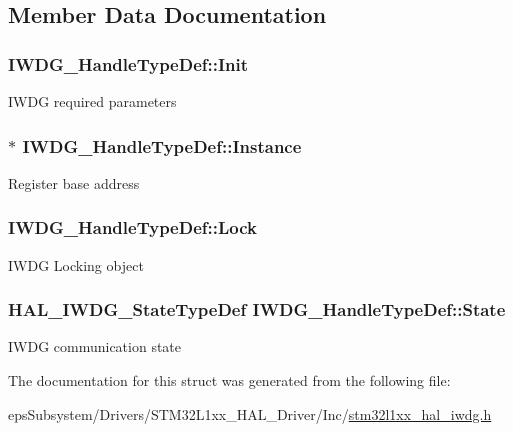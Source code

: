 \subsection{Member Data Documentation}
\hypertarget{struct_i_w_d_g___handle_type_def_ae308075a425af205912feb4059c6f213}{
\subsubsection[{Init}]{ I\-W\-D\-G\-\_\-\-Handle\-Type\-Def\-::\-Init}}\label{struct_i_w_d_g___handle_type_def_ae308075a425af205912feb4059c6f213}
I\-W\-D\-G required parameters \hypertarget{struct_i_w_d_g___handle_type_def_ad3fd4c46ef1e9b842328ca4e3290708e}{
\subsubsection[{Instance}]{$\ast$ I\-W\-D\-G\-\_\-\-Handle\-Type\-Def\-::\-Instance}}\label{struct_i_w_d_g___handle_type_def_ad3fd4c46ef1e9b842328ca4e3290708e}
Register base address \hypertarget{struct_i_w_d_g___handle_type_def_a89ec8a98b121ce7167707d4af23a822d}{
\subsubsection[{Lock}]{ I\-W\-D\-G\-\_\-\-Handle\-Type\-Def\-::\-Lock}}\label{struct_i_w_d_g___handle_type_def_a89ec8a98b121ce7167707d4af23a822d}
I\-W\-D\-G Locking object \hypertarget{struct_i_w_d_g___handle_type_def_ad0e66d3745ab620bd7f6138880a8f299}{
\subsubsection[{State}]{ {\bf H\-A\-L\-\_\-\-I\-W\-D\-G\-\_\-\-State\-Type\-Def} I\-W\-D\-G\-\_\-\-Handle\-Type\-Def\-::\-State}}\label{struct_i_w_d_g___handle_type_def_ad0e66d3745ab620bd7f6138880a8f299}
I\-W\-D\-G communication state 

The documentation for this struct was generated from the following file\-:\begin{DoxyCompactItemize}
\item 
eps\-Subsystem/\-Drivers/\-S\-T\-M32\-L1xx\-\_\-\-H\-A\-L\-\_\-\-Driver/\-Inc/\hyperlink{stm32l1xx__hal__iwdg_8h}{stm32l1xx\-\_\-hal\-\_\-iwdg.\-h}\end{DoxyCompactItemize}
